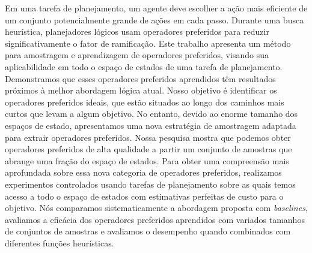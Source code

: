 \documentclass[ppgc,diss,english]{iiufrgs}
\begin{document}
\begin{translatedabstract}
Em uma tarefa de planejamento, um agente deve escolher a ação mais eficiente de um conjunto potencialmente grande de ações em cada passo. Durante uma busca heurística, planejadores lógicos usam operadores preferidos para reduzir significativamente o fator de ramificação. Este trabalho apresenta um método para amostragem e aprendizagem de operadores preferidos, visando sua aplicabilidade em todo o espaço de estados de uma tarefa de planejamento. Demonstramos que esses operadores preferidos aprendidos têm resultados próximos à melhor abordagem lógica atual.
Nosso objetivo é identificar os operadores preferidos ideais, que estão situados ao longo dos caminhos mais curtos que levam a algum objetivo. No entanto, devido ao enorme tamanho dos espaços de estado, apresentamos uma nova estratégia de amostragem adaptada para extrair operadores preferidos. Nossa pesquisa mostra que podemos obter operadores preferidos de alta qualidade a partir um conjunto de amostras que abrange uma fração do espaço de estados.
Para obter uma compreensão mais aprofundada sobre essa nova categoria de operadores preferidos, realizamos experimentos controlados usando tarefas de planejamento sobre as quais temos acesso a todo o espaço de estados com estimativas perfeitas de custo para o objetivo. Nós comparamos sistematicamente a abordagem proposta com \textit{baselines}, avaliamos a eficácia dos operadores preferidos aprendidos com variados tamanhos de conjuntos de amostras e avaliamos o desempenho quando combinados com diferentes funções heurísticas.
\end{translatedabstract}
\end{document}
